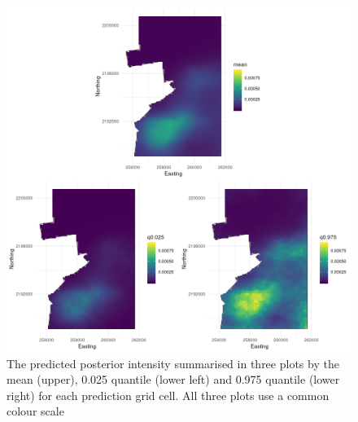 \documentclass[preprint,12pt]{elsarticle}
\begin{document}
\begin{figure}[h]
	\begin{center}
		\includegraphics[scale=0.4]{figures/intensity_quantiles.png}
		\caption{The predicted posterior intensity summarised in three plots by the mean (upper),  0.025 quantile (lower left) and 0.975 quantile (lower right) for each prediction grid cell.  All three plots use a common colour scale}
		\label{fig:intensity-quantiles}
	\end{center}
\end{figure}
\end{document}
